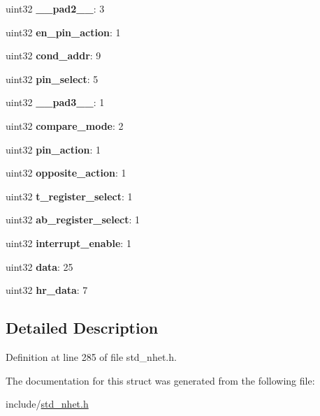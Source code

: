 \begin{DoxyCompactItemize}
uint32 {\bfseries \+\_\+\+\_\+pad2\+\_\+\+\_\+}\+: 3
\item 
\mbox{\label{structdadm64__format_a887eab552de978a8eadd51ec75b0e533}} 
uint32 {\bfseries en\+\_\+pin\+\_\+action}\+: 1
\item 
\mbox{\label{structdadm64__format_a6769795290fad32b3ac2f3476adeb505}} 
uint32 {\bfseries cond\+\_\+addr}\+: 9
\item 
\mbox{\label{structdadm64__format_a5d7c4a506d3045e8491b5e4a72939517}} 
uint32 {\bfseries pin\+\_\+select}\+: 5
\item 
\mbox{\label{structdadm64__format_af0d7a546b1c5bf2911738ea44739522c}} 
uint32 {\bfseries \+\_\+\+\_\+pad3\+\_\+\+\_\+}\+: 1
\item 
\mbox{\label{structdadm64__format_a072e7a987d534ca5f71e0c1a9719b53d}} 
uint32 {\bfseries compare\+\_\+mode}\+: 2
\item 
\mbox{\label{structdadm64__format_abfd736d299520b184ca845eee7f64893}} 
uint32 {\bfseries pin\+\_\+action}\+: 1
\item 
\mbox{\label{structdadm64__format_a53e94b2876eee15d9001fbd6af5348c9}} 
uint32 {\bfseries opposite\+\_\+action}\+: 1
\item 
\mbox{\label{structdadm64__format_a54973f4771fe069e3e18fedea2e39ba2}} 
uint32 {\bfseries t\+\_\+register\+\_\+select}\+: 1
\item 
\mbox{\label{structdadm64__format_a7e86ea53837ad64981ee4a0f21724108}} 
uint32 {\bfseries ab\+\_\+register\+\_\+select}\+: 1
\item 
\mbox{\label{structdadm64__format_a3bb6f3978abfdadffd4cb7a99a37b6c5}} 
uint32 {\bfseries interrupt\+\_\+enable}\+: 1
\item 
\mbox{\label{structdadm64__format_a24ad69378725de64bdd06df6d35d4224}} 
uint32 {\bfseries data}\+: 25
\item 
\mbox{\label{structdadm64__format_abb35bf4711770804489e195f3e504673}} 
uint32 {\bfseries hr\+\_\+data}\+: 7
\end{DoxyCompactItemize}


\subsection{Detailed Description}


Definition at line 285 of file std\+\_\+nhet.\+h.



The documentation for this struct was generated from the following file\+:\begin{DoxyCompactItemize}
\item 
include/\mbox{\hyperlink{std__nhet_8h}{std\+\_\+nhet.\+h}}\end{DoxyCompactItemize}
